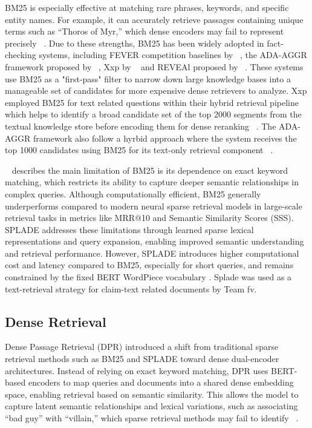 BM25 is especially effective at matching rare phrases, keywords, and specific entity names. For example, it can accurately retrieve passages containing unique terms such as “Thoros of Myr,” which dense encoders may fail to represent precisely ~\cite{Karpukhin2020Nov}. Due to these strengths, BM25 has been widely adopted in fact-checking systems, including FEVER competition baselines by ~\citet{Cao2025May}, the ADA-AGGR framework proposed by ~\citet{Upravitelev2026Mar}, Xxp by ~\citet{Tsoneva2026Mar} and REVEAl proposed by ~\citet{Tariq2026Mar}. These systems use BM25 as a "first-pass" filter to narrow down large knowledge bases into a manageable set of candidates for more expensive dense retrievers to analyze. Xxp employed BM25 for text related questions within their hybrid retrieval pipeline which helps to identify a broad candidate set of the top 2000 segments from the textual knowledge store before encoding them for dense reranking ~\cite{Tsoneva2026Mar}. The ADA-AGGR framework  also follow a hyrbid approach where the system receives the top 1000 candidates using BM25 for its text-only retrieval component ~\cite{Upravitelev2026Mar}.

~\citet{Won2025Nov} describes the main limitation of BM25 is its dependence on exact keyword matching, which restricts its ability to capture deeper semantic relationships in complex queries. Although computationally efficient, BM25 generally underperforms compared to modern neural sparse retrieval models in large-scale retrieval tasks in metrics like MRR@10 and Semantic Similarity Scores (SSS). SPLADE addresses these limitations through learned sparse lexical representations and query expansion, enabling improved semantic understanding and retrieval performance. However, SPLADE introduces higher computational cost and latency compared to BM25, especially for short queries, and remains constrained by the fixed BERT WordPiece vocabulary . Splade was used as a text-retrieval strategy for claim-text related documents by Team fv.

\subsection{Dense Retrieval}

Dense Passage Retrieval (DPR) introduced a shift from traditional sparse retrieval methods such as BM25 and SPLADE toward dense dual-encoder architectures. Instead of relying on exact keyword matching, DPR uses BERT-based encoders to map queries and documents into a shared dense embedding space, enabling retrieval based on semantic similarity. This allows the model to capture latent semantic relationships and lexical variations, such as associating “bad guy” with “villain,” which sparse retrieval methods may fail to identify ~\citep{Karpukhin2020Nov}.

